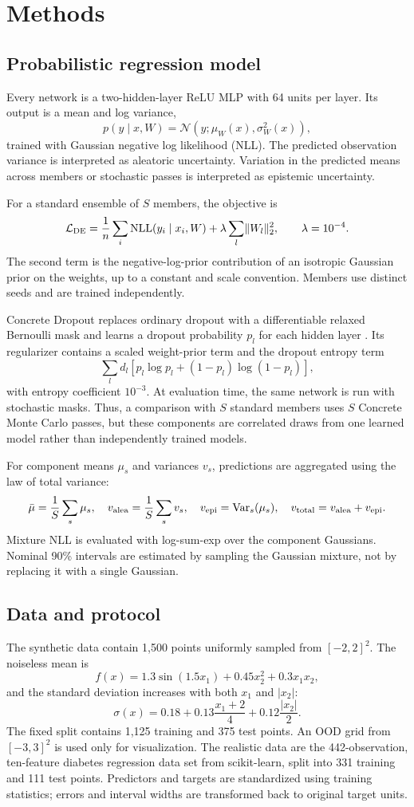 \documentclass[10pt,twocolumn]{article}
\begin{document}
\section{Methods}
\subsection{Probabilistic regression model}
Every network is a two-hidden-layer ReLU MLP with 64 units per layer.  Its
output is a mean and log variance,
\[
 p(y\mid x,W)=\mathcal{N}\!\left(y;\mu_W(x),\sigma_W^2(x)\right),
\]
trained with Gaussian negative log likelihood (NLL).  The predicted
observation variance is interpreted as aleatoric uncertainty.  Variation in
the predicted means across members or stochastic passes is interpreted as
epistemic uncertainty.

For a standard ensemble of $S$ members, the objective is
\[
 \mathcal{L}_{\rm DE} =
 \frac{1}{n}\sum_i {\rm NLL}(y_i\mid x_i,W)
 +\lambda\sum_l\lVert W_l\rVert_2^2,\qquad
 \lambda=10^{-4}.
\]
The second term is the negative-log-prior contribution of an isotropic
Gaussian prior on the weights, up to a constant and scale convention.
Members use distinct seeds and are trained independently.

Concrete Dropout replaces ordinary dropout with a differentiable relaxed
Bernoulli mask and learns a dropout probability $p_l$ for each hidden layer
\cite{gal2017concrete}.  Its regularizer contains a scaled weight-prior term
and the dropout entropy term
\[
 \sum_l d_l\left[p_l\log p_l+(1-p_l)\log(1-p_l)\right],
\]
with entropy coefficient $10^{-3}$.  At evaluation time, the same network is
run with stochastic masks.  Thus, a comparison with $S$ standard members
uses $S$ Concrete Monte Carlo passes, but these components are correlated
draws from one learned model rather than independently trained models.

For component means $\mu_s$ and variances $v_s$, predictions are aggregated
using the law of total variance:
\[
 \bar\mu=\frac{1}{S}\sum_s\mu_s,\quad
 v_{\rm alea}=\frac{1}{S}\sum_s v_s,\quad
 v_{\rm epi}=\operatorname{Var}_s(\mu_s),\quad
 v_{\rm total}=v_{\rm alea}+v_{\rm epi}.
\]
Mixture NLL is evaluated with log-sum-exp over the component Gaussians.
Nominal 90\% intervals are estimated by sampling the Gaussian mixture, not
by replacing it with a single Gaussian.

\subsection{Data and protocol}
The synthetic data contain 1,500 points uniformly sampled from
$[-2,2]^2$.  The noiseless mean is
\[
 f(x)=1.3\sin(1.5x_1)+0.45x_2^2+0.3x_1x_2,
\]
and the standard deviation increases with both $x_1$ and $|x_2|$:
\[
 \sigma(x)=0.18+0.13\frac{x_1+2}{4}+0.12\frac{|x_2|}{2}.
\]
The fixed split contains 1,125 training and 375 test points.  An OOD grid
from $[-3,3]^2$ is used only for visualization.  The realistic data are
the 442-observation, ten-feature diabetes regression data set from
scikit-learn, split into 331 training and 111 test points.  Predictors and
targets are standardized using training statistics; errors and interval
widths are transformed back to original target units.
\end{document}
